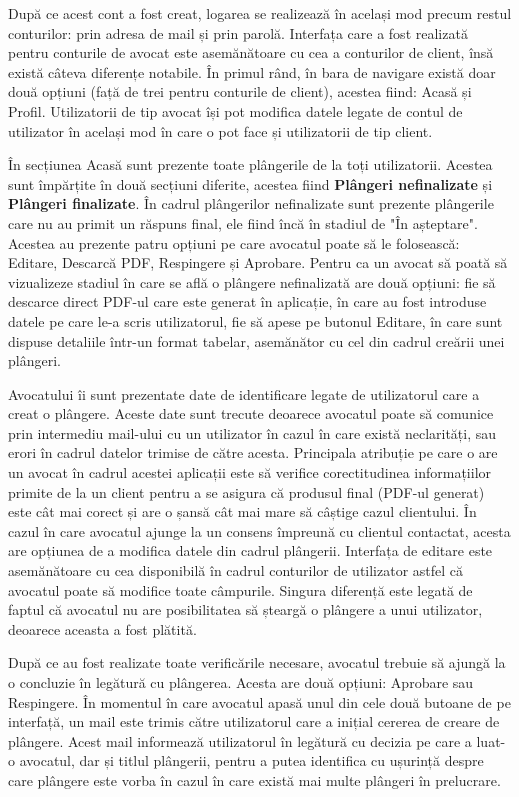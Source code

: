 \documentclass[12pt,a4paper]{report}
\theoremstyle{definition}
\theoremstyle{remark}
\begin{document}
După ce acest cont a fost creat, logarea se realizează în același mod precum restul conturilor: prin adresa de mail și prin parolă. Interfața care a fost realizată pentru conturile de avocat este asemănătoare cu cea a conturilor de client, însă există câteva diferențe notabile. În primul rând, în bara de navigare există doar două opțiuni (față de trei pentru conturile de client), acestea fiind: Acasă și Profil. Utilizatorii de tip avocat își pot modifica datele legate de contul de utilizator în același mod în care o pot face și utilizatorii de tip client.

În secțiunea Acasă sunt prezente toate plângerile de la toți utilizatorii. Acestea sunt împărțite în două secțiuni diferite, acestea fiind \textbf{Plângeri nefinalizate} și \textbf{Plângeri finalizate}. În cadrul plângerilor nefinalizate sunt prezente plângerile care nu au primit un răspuns final, ele fiind încă în stadiul de "În așteptare". Acestea au prezente patru opțiuni pe care avocatul poate să le folosească: Editare, Descarcă PDF, Respingere și Aprobare. Pentru ca un avocat să poată să vizualizeze stadiul în care se află o plângere nefinalizată are două opțiuni: fie să descarce direct PDF-ul care este generat în aplicație, în care au fost introduse datele pe care le-a scris utilizatorul, fie să apese pe butonul Editare, în care sunt dispuse detaliile într-un format tabelar, asemănător cu cel din cadrul creării unei plângeri.

Avocatului îi sunt prezentate date de identificare legate de utilizatorul care a creat o plângere. Aceste date sunt trecute deoarece avocatul poate să comunice prin intermediu mail-ului cu un utilizator în cazul în care există neclarități, sau erori în cadrul datelor trimise de către acesta. Principala atribuție pe care o are un avocat în cadrul acestei aplicații este să verifice corectitudinea informațiilor primite de la un client pentru a se asigura că produsul final (PDF-ul generat) este cât mai corect și are o șansă cât mai mare să câștige cazul clientului. În cazul în care avocatul ajunge la un consens împreună cu clientul contactat, acesta are opțiunea de a modifica datele din cadrul plângerii. Interfața de editare este asemănătoare cu cea disponibilă în cadrul conturilor de utilizator astfel că avocatul poate să modifice toate câmpurile. Singura diferență este legată de faptul că avocatul nu are posibilitatea să șteargă o plângere a unui utilizator, deoarece aceasta a fost plătită.

După ce au fost realizate toate verificările necesare, avocatul trebuie să ajungă la o concluzie în legătură cu plângerea. Acesta are două opțiuni: Aprobare sau Respingere. În momentul în care avocatul apasă unul din cele două butoane de pe interfață, un mail este trimis către utilizatorul care a inițial cererea de creare de plângere. Acest mail informează utilizatorul în legătură cu decizia pe care a luat-o avocatul, dar și titlul plângerii, pentru a putea identifica cu ușurință despre care plângere este vorba în cazul în care există mai multe plângeri în prelucrare.
\newpage
\end{document}
